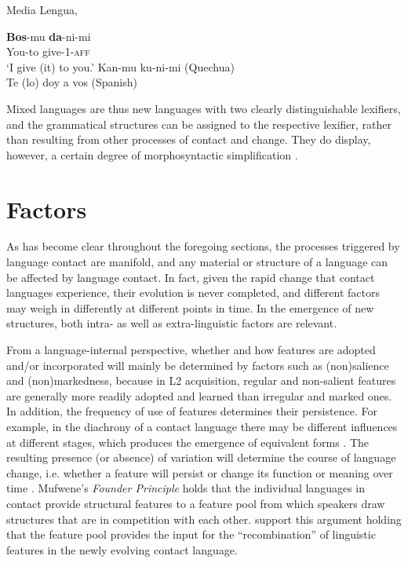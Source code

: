 \documentclass[output=paper,
modfonts
]{langscibook}
\begin{document}
\ea \textnormal{Media Lengua, \citep[384]{muysken1997media}}\\ \label{ex-ML}
    \begin{xlist}
       \ex \gll \textbf{Bos}-mu	\textbf{da}-ni-mi\\
You-to	give-1-\textsc{aff}\\
\glt 	‘I give (it) to you.’
      \ex Kan-mu ku-ni-mi (Quechua)\\
      \ex Te (lo) doy a vos (Spanish)
        \end{xlist}
\z

Mixed languages are thus new languages with two clearly distinguishable lexifiers, and the grammatical structures can be assigned to the respective lexifier, rather than resulting from other processes of contact and change. They do display, however, a certain degree of morphosyntactic simplification \citep{mazzolifortcsecondary}.

\section{Factors} \label{factors}

As has become clear throughout the foregoing sections, the processes triggered by language contact are manifold, and any material or structure of a language can be affected by language contact. In fact, given the rapid change that contact languages experience, their evolution is never completed, and different factors may weigh in differently at different points in time. In the emergence of new structures, both intra- as well as extra-linguistic factors are relevant.

From a language-internal perspective, whether and how features are adopted and/or incorporated will mainly be determined by factors such as (non)salience and (non)markedness, because in L2 acquisition, regular and non-salient features are generally more readily adopted and learned than irregular and marked ones. In addition, the frequency of use of features determines their persistence. For example, in the diachrony of a contact language there may be different influences at different stages, which produces the emergence of equivalent forms \citep{baptista2017competition}. The resulting presence (or absence) of variation will determine the course of language change, i.e. whether a feature will persist or change its function or meaning over time \citep[76]{mufweneetal2017}. Mufwene’s \citeyear{mufwene2001ecology} \emph{Founder Principle} holds that the individual languages in contact provide structural features to a feature pool from which speakers draw structures that are in competition with each other. \cite[50]{Aboh_2006} support this argument holding that the feature pool provides the input for the “recombination” of linguistic features in the newly evolving contact language.
\end{document}
